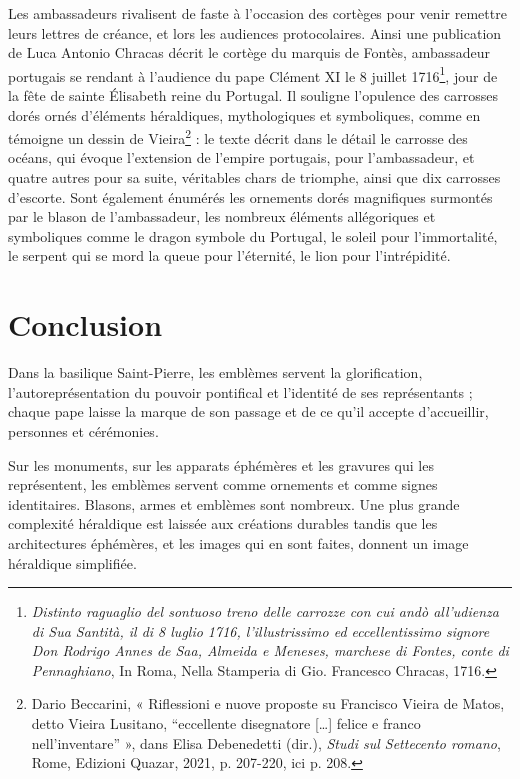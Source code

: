\documentclass[12pt,twoside,openany]{book}
\begin{document}
Les ambassadeurs rivalisent de faste à l’occasion des cortèges pour venir remettre leurs lettres de créance, et lors les audiences protocolaires. Ainsi une publication de Luca Antonio Chracas décrit le cortège du marquis de Fontès, ambassadeur portugais se rendant à l’audience du pape Clément XI le 8 juillet 1716\footnote{\textit{Distinto raguaglio del sontuoso treno delle carrozze con cui andò all’udienza di Sua Santità, il di 8 luglio 1716, l’illustrissimo ed eccellentissimo signore Don Rodrigo Annes de Saa, Almeida e Meneses, marchese di Fontes, conte di Pennaghiano}, In Roma, Nella Stamperia di Gio. Francesco Chracas, 1716.}, jour de la fête de sainte Élisabeth reine du Portugal. Il souligne l’opulence des carrosses dorés ornés d’éléments héraldiques, mythologiques et symboliques, comme en témoigne un dessin de Vieira\footnote{Dario Beccarini, « Riflessioni e nuove proposte su Francisco Vieira de Matos, detto Vieira Lusitano, “eccellente disegnatore […] felice e franco nell’inventare” », dans Elisa Debenedetti (dir.), \textit{Studi sul Settecento romano}, Rome, Edizioni Quazar, 2021, p. 207-220, ici p. 208.} : le texte décrit dans le détail le carrosse des océans, qui évoque l’extension de l’empire portugais, pour l’ambassadeur, et quatre autres pour sa suite, véritables chars de triomphe, ainsi que dix carrosses d’escorte. Sont également énumérés les ornements dorés magnifiques surmontés par le blason de l’ambassadeur, les nombreux éléments allégoriques et symboliques comme le dragon symbole du Portugal, le soleil pour l’immortalité, le serpent qui se mord la queue pour l’éternité, le lion pour l’intrépidité.

\section{Conclusion}

Dans la basilique Saint-Pierre, les emblèmes servent la glorification, l’autoreprésentation du pouvoir pontifical et l’identité de ses représentants ; chaque pape laisse la marque de son passage et de ce qu’il accepte d’accueillir, personnes et cérémonies.

Sur les monuments, sur les apparats éphémères et les gravures qui les représentent, les emblèmes servent comme ornements et comme signes identitaires. Blasons, armes et emblèmes sont nombreux. Une plus grande complexité héraldique est laissée aux créations durables tandis que les architectures éphémères, et les images qui en sont faites, donnent un image héraldique simplifiée.
\end{document}
